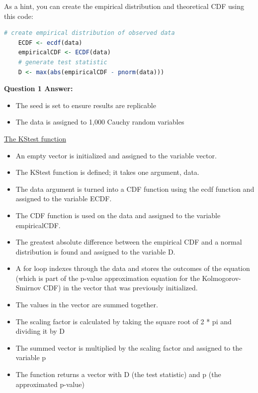 \documentclass[12pt,letterpaper]{article}
\begin{document}
	
\noindent As a hint, you can create the empirical distribution and theoretical CDF using this code:

\begin{lstlisting}[language=R]
	# create empirical distribution of observed data
	ECDF <- ecdf(data)
	empiricalCDF <- ECDF(data)
	# generate test statistic
	D <- max(abs(empiricalCDF - pnorm(data))) \end{lstlisting}

\vspace{.5cm}

\noindent \textbf{Question 1 Answer:}
\begin{itemize}
\item The seed is set to ensure results are replicable
\item The data is assigned to 1,000 Cauchy random variables 
\end{itemize}

 
\vspace{1.5cm}
\underline{The KS\textunderscore test function} 
\begin{itemize}
\item An empty vector is initialized and assigned to the variable vector.
\item The KS\textunderscore test function is defined; it takes one argument, data. 
\item The data argument is turned into a CDF function using the ecdf function and assigned to the variable ECDF.
\item The CDF function is used on the data and assigned to the variable empiricalCDF.
\item The greatest absolute difference between the empirical CDF and a normal distribution is found and assigned to the variable D.
\item A for loop indexes through the data and stores the outcomes of the equation (which is part of the p-value approximation equation for the Kolmogorov-Smirnov CDF) in the vector that was previously initialized.
\item The values in the vector are summed together.
\item The scaling factor is calculated by taking the square root of 2 * pi and dividing it by D
\item The summed vector is multiplied by the scaling factor and assigned to the variable p
\item The function returns a vector with D (the test statistic) and p (the approximated p-value)
\end{itemize}
\end{document}

